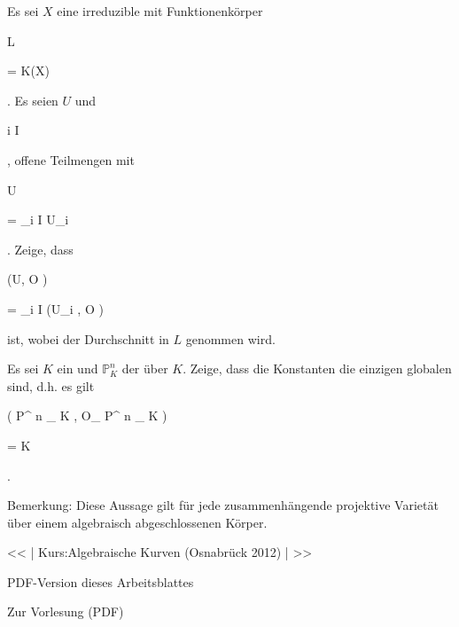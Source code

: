 {} {}



{}

{


Es sei $X$ eine irreduzible
mit Funktionenkörper


\mavergleichskette

{\vergleichskette

{ L
}

{ = }{ K(X)
}

{  }{
}

{    }{
}

{   }{
}

}
{}{}{.}
Es seien $U$ und

 {}

 {i \in I} {}

 {} {} {} {,} offene Teilmengen mit


\mavergleichskette

{\vergleichskette

{ U
}

{ = }{ \bigcup_{i \in I} U_i
}

{  }{
}

{    }{
}

{   }{
}

}
{}{}{.}
Zeige, dass


\mavergleichskettedisp

{\vergleichskette

{ \Gamma (U, {\mathcal O} )
}

{ =} { \bigcap_{i \in I} \Gamma (U_i , {\mathcal O} )
}

{ } {
}

{ } {
}

{ } {
}

}
{}{}{}
ist, wobei der Durchschnitt in $L$ genommen wird.


}

{} {}



{}

{


Es sei $K$ ein
und ${\mathbb P}^{ n }_{ K}$ der
über $K$. Zeige, dass die Konstanten die einzigen globalen
sind, d.h. es gilt


\mavergleichskettedisp

{\vergleichskette

{ \Gamma   \left(   {\mathbb P}^{ n }_{ K} ,  {\mathcal O}_{  {\mathbb P}^{ n }_{ K}  }   \right)
}

{ =} { K
}

{ } {
}

{ } {
}

{ } {
}

}
{}{}{.}


}

{Bemerkung: Diese Aussage gilt für jede zusammenhängende projektive Varietät über einem algebraisch abgeschlossenen Körper.} {}


<< | Kurs:Algebraische Kurven (Osnabrück 2012) | >>


PDF-Version dieses Arbeitsblattes


 Zur Vorlesung
(PDF)
